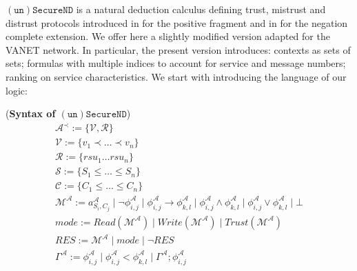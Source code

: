 \documentclass[]{llncs}
\begin{document}
$\mathtt{(un)SecureND}$ is a natural deduction calculus defining trust, mistrust and distrust protocols introduced in \cite{primiero_secureND} for the positive fragment  and in \cite{DBLP:conf/ifiptm/Primiero16} for the negation complete extension. We offer here a slightly modified version adapted for the VANET network. In particular, the present version introduces: contexts as sets of sets; formulas with multiple indices to account for service and message numbers; ranking on service characteristics. We start with introducing the language of our logic:

\begin{definition}(\textbf{Syntax of $\mathtt{(un)SecureND}$})\label{def:syntax} %
	\begin{displaymath}
	\begin{array}{l}
	\mathcal{A}^{\prec}:= \{\mathcal{V, R}\}\\
	\mathcal{V}:= \{v_{1}\prec \ldots \prec v_{n}\}\\
	\mathcal{R}:= \{rsu_{1}\ldots rsu_{n}\}\\
	\mathcal{S}:= \{S_{1}\leq \dots \leq S_{n}\}\\  %
	\mathcal{C}:= \{C_{1}\leq \dots \leq C_{n}\}\\  %
	\mathcal{M^{\mathcal{A}}}:= a^{\mathcal{A}}_{S_{i},C_{j}}\mid \neg \phi^{\mathcal{A}}_{i,j}\mid \phi^{\mathcal{A}}_{i,j}\rightarrow \phi^{\mathcal{A}}_{k,l}\mid \phi^{\mathcal{A}}_{i,j}\wedge \phi^{\mathcal{A}}_{k,l}\mid \phi^{\mathcal{A}}_{i,j}\vee \phi^{\mathcal{A}}_{k,l} \mid \bot\\
	mode:= Read(\mathcal{M}^{\mathcal{A}})\mid Write(\mathcal{M}^{\mathcal{A}})\mid Trust(\mathcal{M}^{\mathcal{A}})\\
	RES:= \mathcal{M}^{\mathcal{A}}\mid mode\mid \neg RES\\
	\Gamma^{\mathcal{A}}:= 
	\phi^{\mathcal{A}}_{i,j} \mid \phi^{\mathcal{A}}_{i,j} < \phi^{\mathcal{A}}_{k,l} \mid \Gamma^{\mathcal{A}}; \phi^{\mathcal{A}}_{i,j}
	
	\end{array}
	\end{displaymath}
\end{definition}
%
\end{document}
